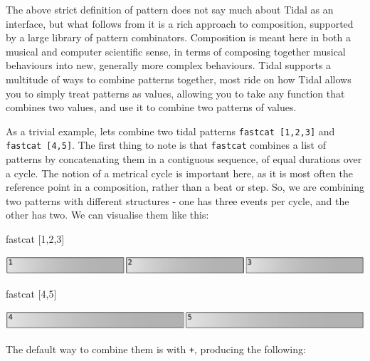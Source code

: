 \documentclass[
]{article}
\newenvironment{Shaded}{\begin{snugshade}}{\end{snugshade}}
\newcommand{\DecValTok}[1]{\textcolor[rgb]{0.00,0.00,0.81}{#1}}
\newcommand{\NormalTok}[1]{#1}
\begin{document}
The above strict definition of pattern does not say much about Tidal as
an interface, but what follows from it is a rich approach to
composition, supported by a large library of pattern combinators.
Composition is meant here in both a musical and computer scientific
sense, in terms of composing together musical behaviours into new,
generally more complex behaviours. Tidal supports a multitude of ways to
combine patterns together, most ride on how Tidal allows you to simply
treat patterns as values, allowing you to take any function that
combines two values, and use it to combine two patterns of values.

As a trivial example, lets combine two tidal patterns
\texttt{fastcat\ {[}1,2,3{]}} and \texttt{fastcat\ {[}4,5{]}}. The first
thing to note is that \texttt{fastcat} combines a list of patterns by
concatenating them in a contiguous sequence, of equal durations over a
cycle. The notion of a metrical cycle is important here, as it is most
often the reference point in a composition, rather than a beat or step.
So, we are combining two patterns with different structures - one has
three events per cycle, and the other has two. We can visualise them
like this:

\begin{Shaded}
\begin{Highlighting}[]
\NormalTok{fastcat [}\DecValTok{1}\NormalTok{,}\DecValTok{2}\NormalTok{,}\DecValTok{3}\NormalTok{]}
\end{Highlighting}
\end{Shaded}

\includegraphics[width=1\textwidth,height=\textheight]{figures/2efc8e658200e8b94a2bd3f87ef273ce_0.pdf}

\begin{Shaded}
\begin{Highlighting}[]
\NormalTok{fastcat [}\DecValTok{4}\NormalTok{,}\DecValTok{5}\NormalTok{]}
\end{Highlighting}
\end{Shaded}

\includegraphics[width=1\textwidth,height=\textheight]{figures/a5de1a12bad00c7c2d103e9b5e3f75f5_0.pdf}

The default way to combine them is with \texttt{+}, producing the
following:
\end{document}
